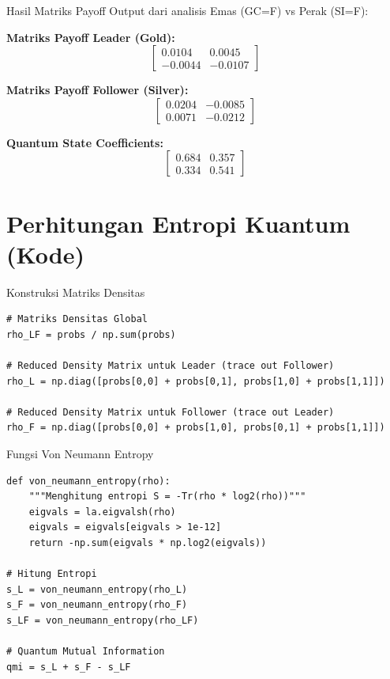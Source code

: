 \documentclass[aspectratio=169]{beamer}
\begin{document}
\begin{frame}{Hasil Matriks Payoff}
    Output dari analisis Emas (GC=F) vs Perak (SI=F):
    
    \vspace{0.3cm}
    
    \textbf{Matriks Payoff Leader (Gold):}
    \begin{equation*}
        \begin{bmatrix} 0.0104 & 0.0045 \\ -0.0044 & -0.0107 \end{bmatrix}
    \end{equation*}
    
    \textbf{Matriks Payoff Follower (Silver):}
    \begin{equation*}
        \begin{bmatrix} 0.0204 & -0.0085 \\ 0.0071 & -0.0212 \end{bmatrix}
    \end{equation*}
    
    \textbf{Quantum State Coefficients:}
    \begin{equation*}
        \begin{bmatrix} 0.684 & 0.357 \\ 0.334 & 0.541 \end{bmatrix}
    \end{equation*}
\end{frame}

\section{Perhitungan Entropi Kuantum (Kode)}

\begin{frame}[fragile]{Konstruksi Matriks Densitas}
\begin{lstlisting}
# Matriks Densitas Global
rho_LF = probs / np.sum(probs) 

# Reduced Density Matrix untuk Leader (trace out Follower)
rho_L = np.diag([probs[0,0] + probs[0,1], probs[1,0] + probs[1,1]])

# Reduced Density Matrix untuk Follower (trace out Leader)
rho_F = np.diag([probs[0,0] + probs[1,0], probs[0,1] + probs[1,1]])
\end{lstlisting}
\end{frame}

\begin{frame}[fragile]{Fungsi Von Neumann Entropy}
\begin{lstlisting}
def von_neumann_entropy(rho):
    """Menghitung entropi S = -Tr(rho * log2(rho))"""
    eigvals = la.eigvalsh(rho)
    eigvals = eigvals[eigvals > 1e-12]
    return -np.sum(eigvals * np.log2(eigvals))

# Hitung Entropi
s_L = von_neumann_entropy(rho_L)
s_F = von_neumann_entropy(rho_F)
s_LF = von_neumann_entropy(rho_LF)

# Quantum Mutual Information
qmi = s_L + s_F - s_LF
\end{lstlisting}
\end{frame}
\end{document}
